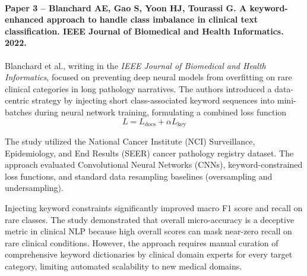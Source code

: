 \paragraph{Paper 3 -- Blanchard AE, Gao S, Yoon HJ, Tourassi G. A keyword-enhanced approach to handle class imbalance in clinical text classification. IEEE Journal of Biomedical and Health Informatics. 2022.}

Blanchard et al., writing in the \textit{IEEE Journal of Biomedical and Health Informatics}, focused on preventing deep neural models from overfitting on rare clinical categories in long pathology narratives. The authors introduced a data-centric strategy by injecting short class-associated keyword sequences into mini-batches during neural network training, formulating a combined loss function
\[
L = L_{\text{docs}} + \alpha L_{\text{key}}
\]

The study utilized the National Cancer Institute (NCI) Surveillance, Epidemiology, and End Results (SEER) cancer pathology registry dataset. The approach evaluated Convolutional Neural Networks (CNNs), keyword-constrained loss functions, and standard data resampling baselines (oversampling and undersampling).

Injecting keyword constraints significantly improved macro F1 score and recall on rare classes. The study demonstrated that overall micro-accuracy is a deceptive metric in clinical NLP because high overall scores can mask near-zero recall on rare clinical conditions. However, the approach requires manual curation of comprehensive keyword dictionaries by clinical domain experts for every target category, limiting automated scalability to new medical domains.

